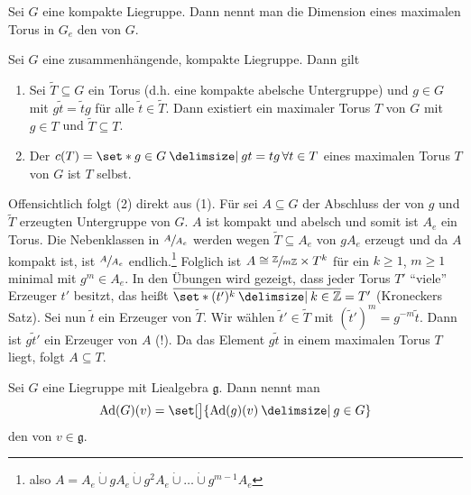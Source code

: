 \begin{definition}[{name=[Rang einer Liegruppe]}]
	Sei $G$ eine kompakte Liegruppe.
	Dann nennt man die Dimension eines maximalen Torus in $G_e$ den  von $G$.
\end{definition}

\begin{lemma}[label=lem:246,{name=[Zentralisator eines maximalen Torus]}]
	Sei $G$ eine zusammenhängende, kompakte Liegruppe.
	Dann gilt
	\begin{enumerate}[(1)]
		\item Sei $\tilde{T} \subseteq G$ ein Torus (d.h. eine kompakte abelsche Untergruppe) und $g \in G$ mit $g \tilde{t} = \tilde{t}g$ für alle $\tilde{t} \in \tilde{T}$.
		Dann existiert ein maximaler Torus $T$ von $G$ mit $g \in T$ und $\tilde{T} \subseteq T$.
		\item Der  $c(T) = \set*{g \in G \given g t =tg \,\forall t \in T}$ eines maximalen Torus $T$ von $G$ ist $T$ selbst.
	\end{enumerate}
\end{lemma}
\begin{beweis}
	Offensichtlich folgt (2) direkt aus (1).
	Für sei $A \subseteq G$ der Abschluss der von $g$ und $\tilde{T}$ erzeugten Untergruppe von $G$.
	$A$ ist kompakt und abelsch und somit ist $A_e$ ein Torus.
	Die Nebenklassen in $\sfrac{A}{A_e}$ werden wegen $\tilde{T} \subseteq A_e$ von $g A_e$ erzeugt und da $A$ kompakt ist, ist $\sfrac{A}{A_e}$ endlich.\footnote{also $A = A_e \mathbin{\dot{\cup}} g A_e \mathbin{\dot{\cup}} g^2 A_e \mathbin{\dot{\cup}} \ldots \mathbin{\dot{\cup}} g^{m-1}A_e$}
	Folglich ist $A \cong \sfrac{\mathbb{Z}}{m \mathbb{Z}} \times T^k$ für ein $k \ge 1$, $m \ge 1$ minimal mit $g^m \in A_e$.
	In den Übungen wird gezeigt, dass jeder Torus $T'$ \enquote{viele} Erzeuger $t'$ besitzt, das heißt $\overline{\set*{(t')^k \given k \in \mathbb{Z}}} = T'$ (Kroneckers Satz).
	Sei nun $\tilde{t}$ ein Erzeuger von $\tilde{T}$.
	Wir wählen $\tilde{t}' \in \tilde{T}$ mit $(\tilde{t}')^m = g^{-m} \tilde{t}$.
	Dann ist $g \tilde{t}'$ ein Erzeuger von $A$ (!).
	Da das Element $g \tilde{t}$ in einem maximalen Torus $T$ liegt, folgt $A \subseteq T$.
\end{beweis}

\begin{definition}[{name=[adjungierter Orbit]}]
	Sei $G$ eine Liegruppe mit Liealgebra $\mathfrak{g}$.
	Dann nennt man 
	\[
		\Ad(G)(v) = \set[\big]{\Ad(g)(v) \given g \in G}
	\]
	den  von $v \in \mathfrak{g}$. 
\end{definition}

